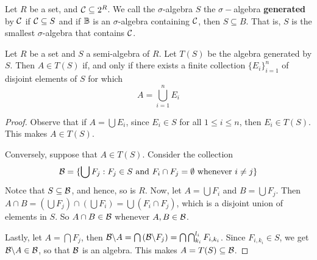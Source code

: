\begin{definition}
    Let $R$ be a set, and  $\mathcal{C} \subseteq 2^R$. We call the $\sigma$-algebra $S$
    the $\sigma-$algebra \textbf{generated} by $\mathcal{C}$ if  $\mathcal{C} \subseteq S$ and
    if $\mathbb{B}$ is an $\sigma$-algebra containing $\mathcal{C}$, then  $S \subseteq B$. That
    is,  $S$ is the smallest $\sigma$-algebra that contains  $\mathcal{C}$.
\end{definition}

\begin{lemma}\label{lemma_5}
    Let $R$ be a set and $S$ a semi-algebra of $R$. Let  $T(S)$ be the algebra
    generated by $S$. Then $A \in T(S)$ if, and only if there exists a finite
    collection $\{E_i\}_{i=1}^n$ of disjoint elements of $S$ for which
    \begin{equation*}
        A=\bigcup_{i=1}^n{E_i}
    \end{equation*}
\end{lemma}
\begin{proof}
    Observe that if $A=\bigcup{E_i}$, since $E_i \in S$ for all  $1 \leq i \leq
    n$, then $E_i \in T(S)$. This makes $A \in T(S)$.

    Conversely, suppose that $A \in T(S)$. Consider the collection
    \begin{equation*}
        \mathcal{B}=\{\bigcup{F_j} : F_j \in S \text{ and } F_i \cap F_j=\emptyset
        \text{ whenever } i \neq j\}
    \end{equation*}
    Notce that $S \subseteq \mathcal{B}$, and hence, so is $R$. Now, let
    $A=\bigcup{F_i}$ and $B=\bigcup{F_j}$. Then $A \cap B=(\bigcup{F_j}) \cap
    (\bigcup{F_i})=\bigcup{(F_i \cap F_j)}$, which is a disjoint union of
    elements in $S$. So  $A \cap B \in \mathcal{B}$ whenever  $A,B \in \mathcal{B}$.

    Lastly, let  $A=\bigcap{F_j}$, then
    $\mathcal{B}\backslash A=\bigcap{(\mathcal{B}\backslash F_j)}=\bigcap{\bigcap_{k_i}^{l_i}{F_{i,k_i}}}$.
    Since $F_{i,k_i} \in S$, we get $\mathcal{B}\backslash A \in \mathcal{B}$, so that $\mathcal{B}$ is an
    algebra. This makes $A=T(S) \subseteq \mathcal{B}$.
\end{proof}

